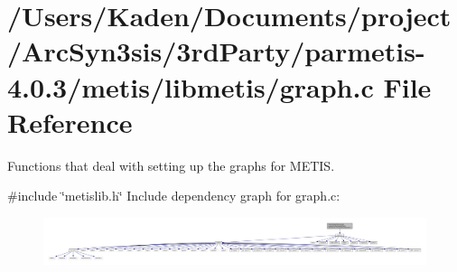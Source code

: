\hypertarget{a00849}{}\section{/\+Users/\+Kaden/\+Documents/project/\+Arc\+Syn3sis/3rd\+Party/parmetis-\/4.0.3/metis/libmetis/graph.c File Reference}
\label{a00849}


Functions that deal with setting up the graphs for M\+E\+T\+IS.  


{\ttfamily \#include \char`\"{}metislib.\+h\char`\"{}}\newline
Include dependency graph for graph.\+c\+:\nopagebreak
\begin{figure}[H]
\begin{center}
\leavevmode
\includegraphics[width=350pt]{a00850}
\end{center}
\end{figure}
